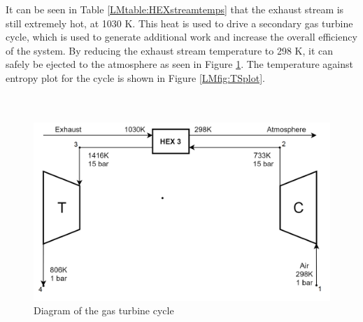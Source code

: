 It can be seen in Table \ref{LMtable:HEXstreamtemps} that the exhaust stream is still extremely hot, at 1030 K. This heat is used to drive a secondary gas turbine cycle, which is used to generate additional work and increase the overall efficiency of the system. By reducing the exhaust stream temperature to 298 K, it can safely be ejected to the atmosphere as seen in Figure \ref{LMfig:gascycle}. The temperature against entropy plot for the cycle is shown in Figure \ref{LMfig:TSplot}. 
\hspace{1cm}\\
\hspace{1cm}\\
\hspace{1cm}\\
\begin{figure}[h]
    \centering
    \includegraphics[scale=0.9]{GasCycle.png}
    \caption{Diagram of the gas turbine cycle}
    \label{LMfig:gascycle}
\end{figure}

